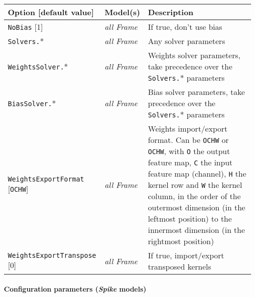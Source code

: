 \documentclass[a4paper,11pt,oneside]{article}
\begin{document}
\begin{center}
 \begin{longtable}{| p{4cm} | p{3cm} | p{9cm} | }
 \hline
 Option [default value] & Model(s) & Description\\
 \hline\hline
  \lstinline!NoBias! [1] & \emph{all Frame} & If true, don't use bias \\
  \lstinline!Solvers.!* & \emph{all Frame} & Any solver parameters \\
  \lstinline!WeightsSolver.!* & \emph{all Frame} & Weights solver parameters,
  take precedence over the \lstinline!Solvers.!* parameters \\
  \lstinline!BiasSolver.!* & \emph{all Frame} & Bias solver parameters,
  take precedence over the \lstinline!Solvers.!* parameters \\
  \lstinline!WeightsExportFormat! [\lstinline!OCHW!] & \emph{all Frame} &
  Weights import/export format. Can be \lstinline!OCHW! or \lstinline!OCHW!,
  with \lstinline!O! the output feature map, \lstinline!C! the input feature map
   (channel), \lstinline!H! the kernel row and \lstinline!W! the kernel column,
   in the order of the outermost dimension (in the leftmost position) to the
   innermost dimension (in the rightmost position) \\
  \lstinline!WeightsExportTranspose! [0] & \emph{all Frame} & If true,
  import/export transposed kernels \\
 \hline
\end{longtable}
\end{center}

\paragraph{Configuration parameters (\emph{Spike} models)}
\end{document}
